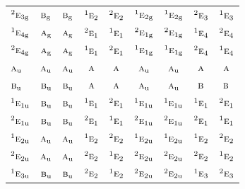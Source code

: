 \documentclass[10pt,a4paper]{article}
\numberwithin{equation}{section}
\newcommand{\irr}[1]{\text{\normalfont\scshape #1}}
\newcommand{\conjpair}[1]{{}^{#1}}
\newcommand{\ptag}[1]{\mathrm{#1}}
\begin{document}
{\begin{longtable}{@{}lcccccccc@{}}
$\conjpair{2}\irr{e}_{3\ptag{g}}$ & $\irr{b}_{\ptag{g}}$ & $\irr{b}_{\ptag{g}}$ & $\conjpair{1}\irr{e}_{2}$ & $\conjpair{2}\irr{e}_{2}$ & $\conjpair{1}\irr{e}_{2\ptag{g}}$ & $\conjpair{1}\irr{e}_{2\ptag{g}}$ & $\conjpair{2}\irr{e}_{3}$ & $\conjpair{1}\irr{e}_{3}$\\
$\conjpair{1}\irr{e}_{4\ptag{g}}$ & $\irr{a}_{\ptag{g}}$ & $\irr{a}_{\ptag{g}}$ & $\conjpair{2}\irr{e}_{1}$ & $\conjpair{1}\irr{e}_{1}$ & $\conjpair{2}\irr{e}_{1\ptag{g}}$ & $\conjpair{2}\irr{e}_{1\ptag{g}}$ & $\conjpair{1}\irr{e}_{4}$ & $\conjpair{2}\irr{e}_{4}$\\
$\conjpair{2}\irr{e}_{4\ptag{g}}$ & $\irr{a}_{\ptag{g}}$ & $\irr{a}_{\ptag{g}}$ & $\conjpair{1}\irr{e}_{1}$ & $\conjpair{2}\irr{e}_{1}$ & $\conjpair{1}\irr{e}_{1\ptag{g}}$ & $\conjpair{1}\irr{e}_{1\ptag{g}}$ & $\conjpair{2}\irr{e}_{4}$ & $\conjpair{1}\irr{e}_{4}$\\
$\irr{a}_{\ptag{u}}$ & $\irr{a}_{\ptag{u}}$ & $\irr{a}_{\ptag{u}}$ & $\irr{a}$ & $\irr{a}$ & $\irr{a}_{\ptag{u}}$ & $\irr{a}_{\ptag{u}}$ & $\irr{a}$ & $\irr{a}$\\
$\irr{b}_{\ptag{u}}$ & $\irr{b}_{\ptag{u}}$ & $\irr{b}_{\ptag{u}}$ & $\irr{a}$ & $\irr{a}$ & $\irr{a}_{\ptag{u}}$ & $\irr{a}_{\ptag{u}}$ & $\irr{b}$ & $\irr{b}$\\
$\conjpair{1}\irr{e}_{1\ptag{u}}$ & $\irr{b}_{\ptag{u}}$ & $\irr{b}_{\ptag{u}}$ & $\conjpair{1}\irr{e}_{1}$ & $\conjpair{2}\irr{e}_{1}$ & $\conjpair{1}\irr{e}_{1\ptag{u}}$ & $\conjpair{1}\irr{e}_{1\ptag{u}}$ & $\conjpair{1}\irr{e}_{1}$ & $\conjpair{2}\irr{e}_{1}$\\
$\conjpair{2}\irr{e}_{1\ptag{u}}$ & $\irr{b}_{\ptag{u}}$ & $\irr{b}_{\ptag{u}}$ & $\conjpair{2}\irr{e}_{1}$ & $\conjpair{1}\irr{e}_{1}$ & $\conjpair{2}\irr{e}_{1\ptag{u}}$ & $\conjpair{2}\irr{e}_{1\ptag{u}}$ & $\conjpair{2}\irr{e}_{1}$ & $\conjpair{1}\irr{e}_{1}$\\
$\conjpair{1}\irr{e}_{2\ptag{u}}$ & $\irr{a}_{\ptag{u}}$ & $\irr{a}_{\ptag{u}}$ & $\conjpair{1}\irr{e}_{2}$ & $\conjpair{2}\irr{e}_{2}$ & $\conjpair{1}\irr{e}_{2\ptag{u}}$ & $\conjpair{1}\irr{e}_{2\ptag{u}}$ & $\conjpair{1}\irr{e}_{2}$ & $\conjpair{2}\irr{e}_{2}$\\
$\conjpair{2}\irr{e}_{2\ptag{u}}$ & $\irr{a}_{\ptag{u}}$ & $\irr{a}_{\ptag{u}}$ & $\conjpair{2}\irr{e}_{2}$ & $\conjpair{1}\irr{e}_{2}$ & $\conjpair{2}\irr{e}_{2\ptag{u}}$ & $\conjpair{2}\irr{e}_{2\ptag{u}}$ & $\conjpair{2}\irr{e}_{2}$ & $\conjpair{1}\irr{e}_{2}$\\
$\conjpair{1}\irr{e}_{3\ptag{u}}$ & $\irr{b}_{\ptag{u}}$ & $\irr{b}_{\ptag{u}}$ & $\conjpair{2}\irr{e}_{2}$ & $\conjpair{1}\irr{e}_{2}$ & $\conjpair{2}\irr{e}_{2\ptag{u}}$ & $\conjpair{2}\irr{e}_{2\ptag{u}}$ & $\conjpair{1}\irr{e}_{3}$ & $\conjpair{2}\irr{e}_{3}$\\

\end{longtable}}
\end{document}
